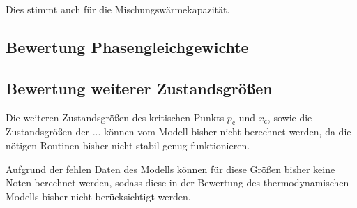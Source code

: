 \documentclass[../thesis.tex]{subfiles}
\begin{document}
Dies stimmt auch für die Mischungswärmekapazität.

\subsection{Bewertung Phasengleichgewichte}

\subsection{Bewertung weiterer Zustandsgrößen}

Die weiteren Zustandsgrößen des kritischen Punkts $ p_{\mathrm{c}}$ und $ x_{\mathrm{c}}$, sowie die Zustandsgrößen der ... können vom Modell bisher nicht berechnet werden, da die nötigen Routinen bisher nicht stabil genug funktionieren.

Aufgrund der fehlen Daten des Modells können für diese Größen bisher keine Noten berechnet werden, sodass diese in der Bewertung des thermodynamischen Modells bisher nicht berücksichtigt werden.
\end{document}
